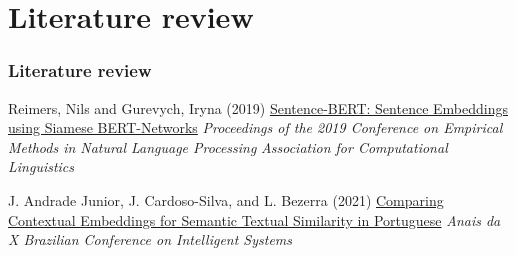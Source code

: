 \section{Literature review}
\begin{frame}
	\frametitle{Literature review}
	
	\begin{thebibliography}{99} %
	\footnotesize %
		\scriptsize
	
		Reimers, Nils and Gurevych, Iryna (2019)
		\newblock \href{http://arxiv.org/abs/1908.10084}{Sentence-BERT: Sentence Embeddings using Siamese BERT-Networks}
		\newblock \emph{Proceedings of the 2019 Conference on Empirical Methods in Natural Language Processing} 
		\newblock \emph{Association for Computational Linguistics} 
		
		J. Andrade Junior, J. Cardoso-Silva, and L. Bezerra (2021)
		\newblock \href{https://core.ac.uk/download/491169432.pdf}{Comparing Contextual Embeddings for	Semantic Textual Similarity in Portuguese}
		\newblock \scriptsize \emph{Anais da X Brazilian Conference on Intelligent Systems} 
		
		\normalsize		 

	\end{thebibliography}

	
	
\end{frame}
